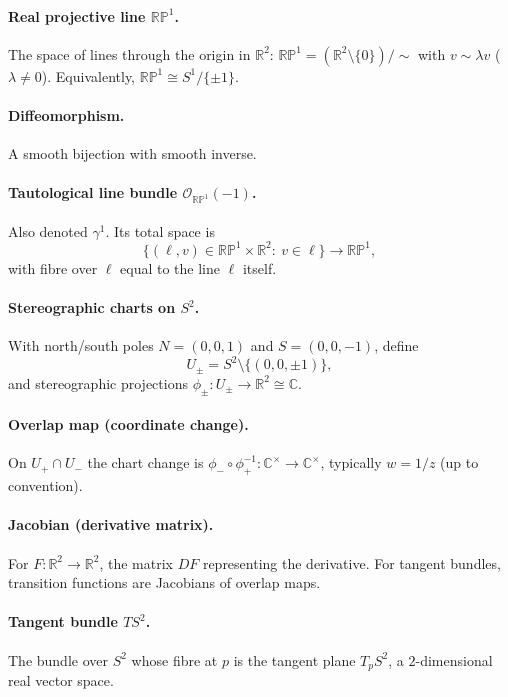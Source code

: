 \documentclass[12pt,a4paper]{article}
\theoremstyle{plain}
\theoremstyle{definition}      %
\begin{document}
\paragraph{\textbf{Real projective line $\mathbb{RP}^1$.}}
The space of lines through the origin in $\mathbb{R}^2$:
$\mathbb{RP}^1 = (\mathbb{R}^2\setminus\{0\})/\sim$ with $v\sim \lambda v$ ($\lambda\neq 0$).
Equivalently, $\mathbb{RP}^1\cong S^1/\{\pm 1\}$.

\paragraph{\textbf{Diffeomorphism.}}
A smooth bijection with smooth inverse.

\paragraph{\textbf{Tautological line bundle $\mathcal{O}_{\mathbb{RP}^1}(-1)$.}}
Also denoted $\gamma^1$. Its total space is
\[
\{(\ell,v)\in \mathbb{RP}^1\times\mathbb{R}^2:\ v\in \ell\}\to \mathbb{RP}^1,
\]
with fibre over $\ell$ equal to the line $\ell$ itself.

\paragraph{\textbf{Stereographic charts on $S^2$.}}
With north/south poles $N=(0,0,1)$ and $S=(0,0,-1)$, define
\[
U_\pm = S^2\setminus\{(0,0,\pm 1)\},
\]
and stereographic projections $\phi_\pm:U_\pm\to \mathbb{R}^2\cong\mathbb{C}$.

\paragraph{\textbf{Overlap map (coordinate change).}}
On $U_+\cap U_-$ the chart change is $\phi_-\circ \phi_+^{-1}:\mathbb{C}^\times\to\mathbb{C}^\times$,
typically $w=1/z$ (up to convention).

\paragraph{\textbf{Jacobian (derivative matrix).}}
For $F:\mathbb{R}^2\to\mathbb{R}^2$, the matrix $DF$ representing the derivative.
For tangent bundles, transition functions are Jacobians of overlap maps.

\paragraph{\textbf{Tangent bundle $TS^2$.}}
The bundle over $S^2$ whose fibre at $p$ is the tangent plane $T_pS^2$, a $2$-dimensional real vector space.
\end{document}
